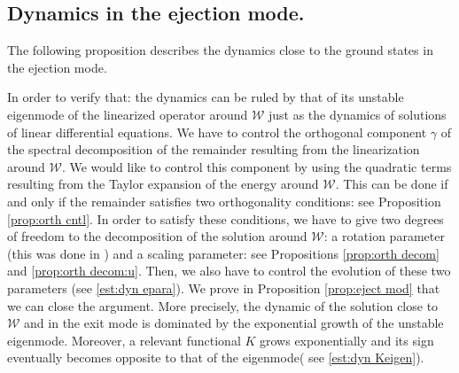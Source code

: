 \documentclass[reqno, 11pt]{amsart}
\numberwithin{equation}{section}
\theoremstyle{plain}
\theoremstyle{definition}
\numberwithin{equation}{section}
\numberwithin{theorem}{section}
\numberwithin{equation}{section}
\numberwithin{equation}{section}
\numberwithin{theorem}{section}
\begin{document}
	
	
	\subsection{Dynamics in the ejection mode.}The following proposition describes the dynamics close to the ground states in the ejection mode.
	
	In order to verify that: the dynamics can be ruled by that of its unstable eigenmode of the linearized operator around $\mathcal{W}$ just as the dynamics of solutions of linear differential equations. We have to control the orthogonal component $\gamma$ of the spectral decomposition of the remainder resulting from the linearization around $\mathcal{W}$. We would like to control this component by using the quadratic terms resulting from the Taylor expansion of the energy around $\mathcal{W}$. This can be done if and only if the remainder satisfies two orthogonality conditions: see Proposition \ref{prop:orth cntl}. In order to satisfy these conditions, we have to give two degrees of freedom to the decomposition of the solution around $\mathcal{W}$: a rotation parameter (this was done in \cite{NakS:NLS}) and a scaling parameter: see Propositions \ref{prop:orth decom} and \ref{prop:orth decom:u}. Then, we also have to control the evolution of these two parameters (see \eqref{est:dyn epara}). We prove in Proposition \ref{prop:eject mod} that we can close the argument. More precisely, the dynamic of the solution close to $\mathcal{W}$ and in the exit mode is dominated by the exponential growth of the unstable eigenmode. Moreover, a relevant functional $K$ grows exponentially and its sign eventually becomes opposite to that of the eigenmode( see \eqref{est:dyn Keigen}).
	
	
	
\end{document}
